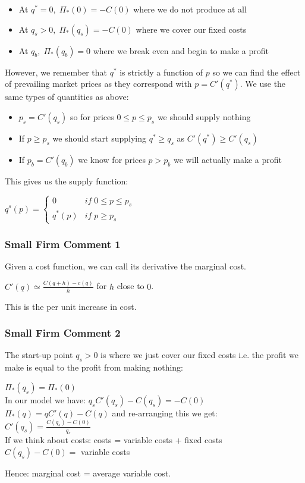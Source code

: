 \documentclass[12pt, letterpaper]{article}
\begin{document}
\begin{itemize}
	\item At $q^*=0, \; \Pi_*(0) = -C(0)$ where we do not produce at all
	\item At $q_s >0, \; \Pi_*(q_s) =  -C(0)$ where we cover our fixed costs
	\item At $q_b, \; \Pi_*(q_b) =  0$ where we break even and begin to make a profit
\end{itemize}
However, we remember that $q^*$ is strictly a function of $p$ so we can find the effect of prevailing market prices as they correspond with $p = C'(q^*)$. We use the same types of quantities as above:
\begin{itemize}
	\item $p_s = C'(q_s)$ so for prices $0 \leq p \leq p_s$ we should supply nothing
	\item If $p \geq p_s$ we should start supplying $q^* \geq q_s$ as $C'(q^*) \geq C'(q_s)$
	\item If $p_b = C'(q_b)$ we know for prices $p > p_b$ we will actually make a profit
\end{itemize}
This gives us the supply function:
\begin{center}
	$q^s(p)=
	\begin{cases}
		0 & if \; 0\leq p \leq p_s\\
		q^*(p) & if \; p\geq p_s
	\end{cases}$
\end{center}
\subsubsection{Small Firm Comment 1}
Given a cost function, we can call its derivative the marginal cost.
\begin{center}
	$C'(q) \simeq \frac{C(q+h)-c(q)}{h}$ for $h$ close to $0$.
\end{center}
This is the per unit increase in cost.

\subsubsection{Small Firm Comment 2}
The start-up point $q_s > 0$ is where we just cover our fixed costs i.e. the profit we make is equal to the profit from making nothing:
\begin{center}
	$\Pi_*(q_s) = \Pi_*(0)$\\
	In our model we have: $q_sC'(q_s) - C(q_s) = -C(0)$\\
	$\Pi_*(q)=qC'(q)-C(q)$ and re-arranging this we get: $C'(q_s)=\frac{C(q_s)-C(0)}{q_s}$\\
	If we think about costs: costs = variable costs + fixed costs\\
	$C(q_s) -C(0) = $ variable costs
\end{center}
Hence: marginal cost = average variable cost.
\end{document}
